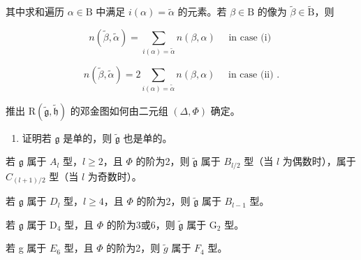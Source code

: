 其中求和遍历 \(\alpha \in \mathrm{B}\) 中满足 \(i(\alpha) = \tilde{\alpha}\) 的元素。若 \(\beta \in \mathrm{B}\) 的像为 \(\tilde{\beta} \in \tilde{\mathrm{B}}\)，则

\[
  n (\tilde {\beta}, \tilde {\alpha}) = \sum_ {i (\alpha) = \tilde {\alpha}} n (\beta , \alpha) \quad \text { in   case   (i) }
\]

\[
n (\tilde {\beta}, \tilde {\alpha}) = 2 \sum_ {i (\alpha) = \tilde {\alpha}} n (\beta , \alpha) \quad \text { in   case   (ii) }.
\]

推出 \(\mathrm{R}(\tilde{\mathfrak{g}},\tilde{\mathfrak{h}})\) 的邓金图如何由二元组 \((\varDelta,\varPhi)\) 确定。

\begin{enumerate}
\def\labelenumi{\alph{enumi})}
\setcounter{enumi}{2}
\tightlist
\item
  证明若 \(\mathfrak{g}\) 是单的，则 \(\tilde{\mathfrak{g}}\) 也是单的。
\end{enumerate}

若 \(\mathfrak{g}\) 属于 \(A_l\) 型，\(l \geq 2\)，且 \(\varPhi\) 的阶为2，则 \(\tilde{\mathfrak{g}}\) 属于 \(B_{l/2}\) 型（当 \(l\) 为偶数时），属于 \(C_{(l+1)/2}\) 型（当 \(l\) 为奇数时）。

若 \(\mathfrak{g}\) 属于 \(D_l\) 型，\(l \geq 4\)，且 \(\varPhi\) 的阶为2，则 \(\tilde{\mathfrak{g}}\) 属于 \(B_{l-1}\) 型。

若 \(\mathfrak{g}\) 属于 \(\mathrm{D}_4\) 型，且 \(\varPhi\) 的阶为3或6，则 \(\tilde{\mathfrak{g}}\) 属于 \(\mathrm{G}_2\) 型。

若 g 属于 \(E_{6}\) 型，且 \(\Phi\) 的阶为2，则 \(\tilde{g}\) 属于 \(F_{4}\) 型。

